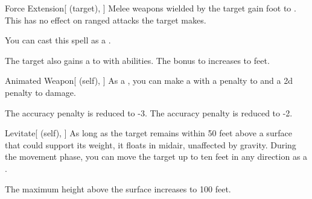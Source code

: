 \lowercase{\hypertarget{spell:Force Extension}{}}\label{spell:Force Extension}
\begin{attuneability}[Rank 3]{\hypertarget{spell:Force Extension}{Force Extension}}[ (target), ]
Melee weapons wielded by the target gain  foot  to .
This has no effect on ranged attacks the target makes.

You can cast this spell as a .

\rankline
{} The target also gains a   to  with  abilities.
 The bonus to  increases to  feet.
\end{attuneability}
\vspace{0.25em}



\lowercase{\hypertarget{spell:Animated Weapon}{}}\label{spell:Animated Weapon}
\begin{attuneability}[Rank 4]{\hypertarget{spell:Animated Weapon}{Animated Weapon}}[ (self), ]
As a , you can make a  with a  penalty to  and a \minus2d penalty to damage.

\rankline
{} The accuracy penalty is reduced to -3.
 The accuracy penalty is reduced to -2.
\end{attuneability}
\vspace{0.25em}



\lowercase{\hypertarget{spell:Levitate}{}}\label{spell:Levitate}
\begin{attuneability}[Rank 5]{\hypertarget{spell:Levitate}{Levitate}}[ (self), ]
As long as the target remains within 50 feet above a surface that could support its weight, it floats in midair, unaffected by gravity.
During the movement phase, you can move the target up to ten feet in any direction as a .

\rankline
{} The maximum height above the surface increases to 100 feet.
\end{attuneability}
\vspace{0.25em}



